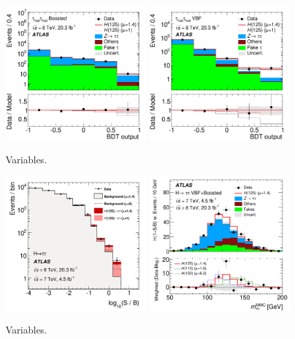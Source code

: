 \begin{figure}[tp]
  \includegraphics[width=0.48\textwidth]{figures/HIGG-2013-32/fig_08f}
  \includegraphics[width=0.48\textwidth]{figures/HIGG-2013-32/fig_08e}
  \caption{Variables.}
  \label{fig:results-bdts}
\end{figure}

\clearpage

\begin{figure}[tp]
  \centering
  \includegraphics[width=0.48\textwidth]{figures/HIGG-2013-32/fig_10}
  \includegraphics[width=0.48\textwidth]{figures/HIGG-2013-32/fig_11b}
  \caption{Variables.}
  \label{fig:results-money-plots}
\end{figure}

